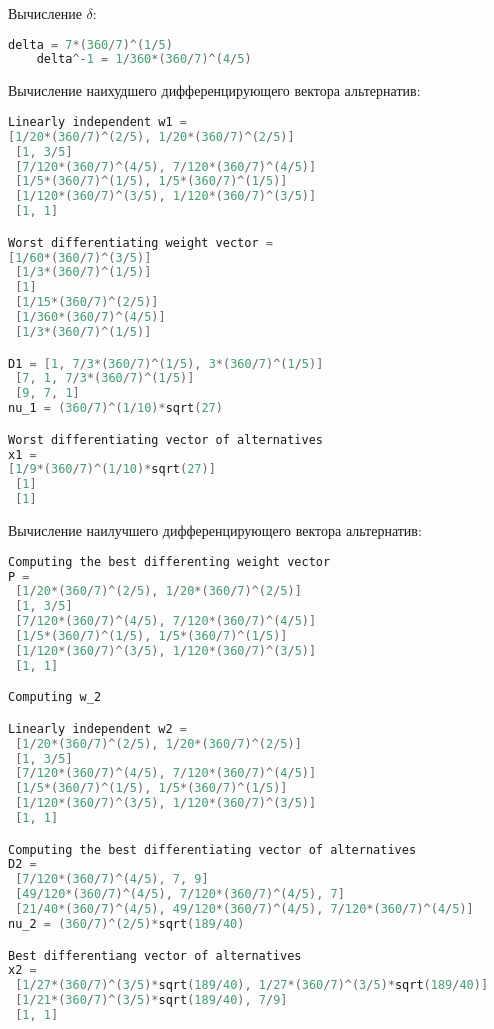 \documentclass[specialist,
	substylefile = spbu.rtx,
	subf,href,colorlinks=true, 12pt]{disser}
\begin{document}
Вычисление $\delta$:
\begin{lstlisting}[language=c++,basicstyle=\footnotesize\ttfamily]
	delta = 7*(360/7)^(1/5)
	delta^-1 = 1/360*(360/7)^(4/5)
\end{lstlisting}
Вычисление наихудшего дифференцирующего вектора альтернатив:
\begin{lstlisting}[language=c++,basicstyle=\scriptsize\ttfamily]
Linearly independent w1 =
[1/20*(360/7)^(2/5), 1/20*(360/7)^(2/5)]
 [1, 3/5]
 [7/120*(360/7)^(4/5), 7/120*(360/7)^(4/5)]
 [1/5*(360/7)^(1/5), 1/5*(360/7)^(1/5)]
 [1/120*(360/7)^(3/5), 1/120*(360/7)^(3/5)]
 [1, 1]

Worst differentiating weight vector =
[1/60*(360/7)^(3/5)]
 [1/3*(360/7)^(1/5)]
 [1]
 [1/15*(360/7)^(2/5)]
 [1/360*(360/7)^(4/5)]
 [1/3*(360/7)^(1/5)]

D1 = [1, 7/3*(360/7)^(1/5), 3*(360/7)^(1/5)]
 [7, 1, 7/3*(360/7)^(1/5)]
 [9, 7, 1]
nu_1 = (360/7)^(1/10)*sqrt(27)

Worst differentiating vector of alternatives
x1 =
[1/9*(360/7)^(1/10)*sqrt(27)]
 [1]
 [1]
\end{lstlisting}
Вычисление наилучшего дифференцирующего вектора альтернатив:
\begin{lstlisting}[language=c++,basicstyle=\footnotesize\ttfamily]
Computing the best differenting weight vector
P =
 [1/20*(360/7)^(2/5), 1/20*(360/7)^(2/5)]
 [1, 3/5]
 [7/120*(360/7)^(4/5), 7/120*(360/7)^(4/5)]
 [1/5*(360/7)^(1/5), 1/5*(360/7)^(1/5)]
 [1/120*(360/7)^(3/5), 1/120*(360/7)^(3/5)]
 [1, 1]

Computing w_2

Linearly independent w2 =
 [1/20*(360/7)^(2/5), 1/20*(360/7)^(2/5)]
 [1, 3/5]
 [7/120*(360/7)^(4/5), 7/120*(360/7)^(4/5)]
 [1/5*(360/7)^(1/5), 1/5*(360/7)^(1/5)]
 [1/120*(360/7)^(3/5), 1/120*(360/7)^(3/5)]
 [1, 1]

Computing the best differentiating vector of alternatives
D2 =
 [7/120*(360/7)^(4/5), 7, 9]
 [49/120*(360/7)^(4/5), 7/120*(360/7)^(4/5), 7]
 [21/40*(360/7)^(4/5), 49/120*(360/7)^(4/5), 7/120*(360/7)^(4/5)]
nu_2 = (360/7)^(2/5)*sqrt(189/40)

Best differentiang vector of alternatives
x2 =
 [1/27*(360/7)^(3/5)*sqrt(189/40), 1/27*(360/7)^(3/5)*sqrt(189/40)]
 [1/21*(360/7)^(3/5)*sqrt(189/40), 7/9]
 [1, 1]
\end{lstlisting}
\end{document}
